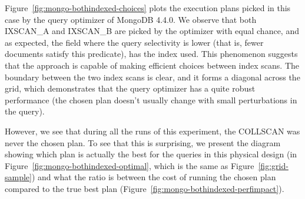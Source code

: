 
Figure~\ref{fig:mongo-bothindexed-choices} plots the execution plans picked in this case by the query optimizer of MongoDB 4.4.0. We observe that both IXSCAN\_A  and IXSCAN\_B are picked by the optimizer with equal chance, and as expected, the field where the query selectivity is lower (that is, fewer documents satisfy this predicate), has the index used.  This phenomenon suggests that the \approachName approach is capable of making efficient choices between index scans. The boundary between the two index scans is clear, and it forms a diagonal across the grid, which demonstrates that the query optimizer has a quite robust performance (the chosen plan doesn't usually change with small perturbations in the query). 

However, we see that during all the runs of this experiment, the COLLSCAN was never the chosen plan. To see that this is surprising, we present the diagram showing which plan is actually the best for the queries in this physical design (in Figure~\ref{fig:mongo-bothindexed-optimal}, which is the same as Figure~\ref{fig:grid-sample}) and what the ratio is between the cost of running the chosen plan compared to the true best plan (Figure~\ref{fig:mongo-bothindexed-perfimpact}). 


